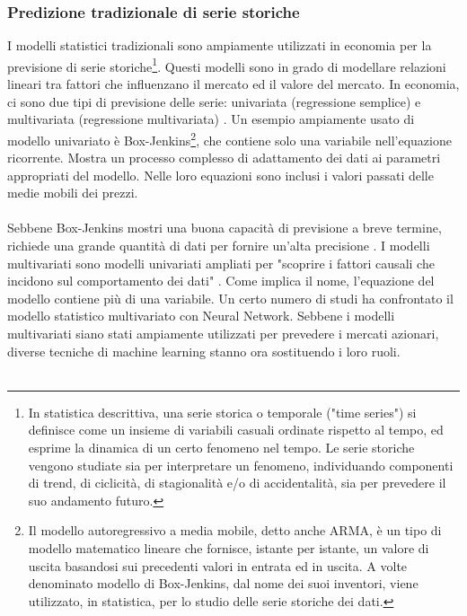 \documentclass[a4paper,12pt]{report}
\begin{document}
\subsubsection{Predizione tradizionale di serie storiche}
I modelli statistici tradizionali sono ampiamente utilizzati in economia per la previsione di serie storiche\footnote{In statistica descrittiva, una serie storica o temporale ("time series") si definisce come un insieme di variabili casuali ordinate rispetto al tempo, ed esprime la dinamica di un certo fenomeno nel tempo. Le serie storiche vengono studiate sia per interpretare un fenomeno, individuando componenti di trend, di ciclicità, di stagionalità e/o di accidentalità, sia per prevedere il suo andamento futuro. }. Questi modelli sono in grado di modellare relazioni lineari tra fattori che influenzano il mercato ed il valore del mercato. In economia, ci sono due tipi di previsione delle serie: univariata (regressione semplice) e multivariata (regressione multivariata) \cite{emh2}. Un esempio ampiamente usato di modello univariato è Box-Jenkins\footnote{Il modello autoregressivo a media mobile, detto anche ARMA, è un tipo di modello matematico lineare che fornisce, istante per istante, un valore di uscita basandosi sui precedenti valori in entrata ed in uscita. A volte denominato modello di Box-Jenkins, dal nome dei suoi inventori, viene utilizzato, in statistica, per lo studio delle serie storiche dei dati.}, che contiene solo una variabile nell'equazione ricorrente. Mostra un processo complesso di adattamento dei dati ai parametri appropriati del modello. Nelle loro equazioni sono inclusi i valori passati delle medie mobili dei prezzi.\\~\\
Sebbene Box-Jenkins mostri una buona capacità di previsione a breve termine, richiede una grande quantità di dati per fornire un'alta precisione \cite{23}. I modelli multivariati sono modelli univariati ampliati per "scoprire i fattori causali che incidono sul comportamento dei dati" \cite{34}. Come implica il nome, l'equazione del modello contiene più di una variabile. Un certo numero di studi ha confrontato il modello statistico multivariato con Neural Network. Sebbene i modelli multivariati siano stati ampiamente utilizzati per prevedere i mercati azionari, diverse tecniche di machine learning stanno ora sostituendo i loro ruoli.\\~\\
\end{document}
